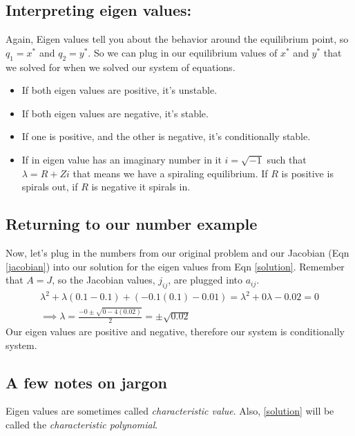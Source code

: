 \documentclass{article}
\begin{document}
\subsection{Interpreting eigen values:}
Again, Eigen values tell you about the behavior around the equilibrium point, so $q_1 = x^*$ and $q_2 = y^*$. So we can plug in our equilibrium values of $x^*$ and $y^*$ that we solved for when we solved our system of equations. 

\begin{itemize}
    \item If both eigen values are positive, it's unstable.
    \item If both eigen values are negative, it's stable.
    \item If one is positive, and the other is negative, it's conditionally stable.
    \item If in eigen value has an imaginary number in it $i = \sqrt{-1}$ such that $\lambda = R + Zi$ that means we have a spiraling equilibrium. If $R$ is positive is spirals out, if $R$ is negative it spirals in.
\end{itemize}

\subsection{Returning to our number example}

Now, let's plug in the numbers from our original problem and our Jacobian (Eqn \ref{jacobian}) into our solution for the eigen values from Eqn \ref{solution}. Remember that $A = J$, so the Jacobian values, $j_{ij}$, are plugged into $a_{ij}$. 
\begin{align}
    \lambda^2 + \lambda (0.1 - 0.1) + (-0.1(0.1) - 0.01) = \lambda^2 + 0 \lambda - 0.02 = 0 \\
    \implies \lambda = \frac{-0 \pm \sqrt{0 - 4(0.02)}}{2} = \pm \sqrt{0.02}
\end{align}
Our eigen values are positive and negative, therefore our system is conditionally system.\\ 

\subsection{A few notes on jargon}
Eigen values are sometimes called \textit{characteristic value}. Also, \ref{solution} will be called the \textit{characteristic polynomial}. \\
\end{document}
